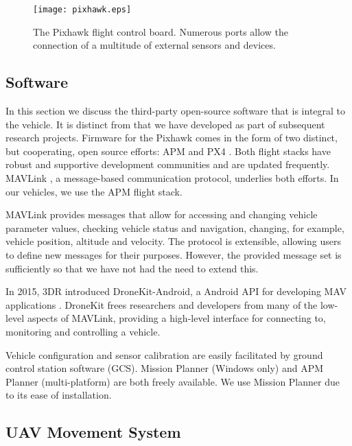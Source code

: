 \documentclass[12pt]{article}
\begin{document}
    \begin{figure}[H]
	\centering
	\texttt{[image: pixhawk.eps]}
	\caption{The Pixhawk flight control board. Numerous ports allow the connection of a multitude of external sensors and devices.\label{fig:pixhawk}}
	\end{figure}

\subsection{Software}
\label{subsec:software}
In this section we discuss the third-party open-source software that is integral to the vehicle. It is distinct from that we have developed as part of subsequent research projects. Firmware for the Pixhawk comes in the form of two distinct, but cooperating, open source efforts: APM \cite{ardupilotdev} and PX4 \cite{meieretalPX42015}. Both flight stacks have robust and supportive development communities and are updated frequently. MAVLink \cite{mavilink}, a message-based communication protocol, underlies both efforts. In our vehicles, we use the APM flight stack.

MAVLink provides messages that allow for accessing and changing vehicle parameter values, checking vehicle status and navigation, changing, for example, vehicle position, altitude and velocity. The protocol is extensible, allowing users to define new messages for their purposes. However, the provided message set is sufficiently so that we have not had the need to extend this.

In 2015, 3DR introduced DroneKit-Android, a Android API for developing MAV applications \cite{dronekit}. DroneKit frees researchers and developers from many of the low-level aspects of MAVLink, providing a high-level interface for connecting to, monitoring and controlling a vehicle.

Vehicle configuration and sensor calibration are easily facilitated by ground control station software (GCS). Mission Planner (Windows only) and APM Planner (multi-platform) are both freely available. We use Mission Planner due to its ease of installation.

\subsection{UAV Movement System}
\label{sec:uav}

\end{document}
